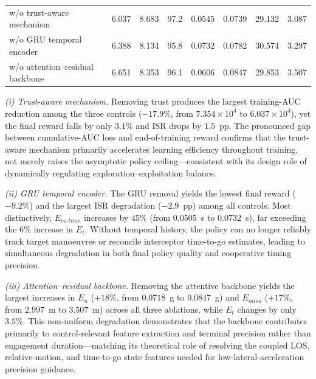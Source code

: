 \documentclass[11pt]{article}
\begin{document}
\begin{tcolorbox}[enhanced,breakable,colback=white,colframe=addblue!55,
coltext=addblue,fontupper=\color{addblue},boxrule=0.6pt,arc=2pt,
left=9pt,right=9pt,top=7pt,bottom=7pt]
{{\begin{tabular}{lccccccc}
w/o trust-aware mechanism
& 6.037 & 8.683 & 97.2
& 0.0545 & 0.0739 & 29.132 & 3.087 \\

w/o GRU temporal encoder
& 6.388 & 8.134 & 95.8
& 0.0732 & 0.0782 & 30.574 & 3.297 \\

w/o attention--residual backbone
& 6.651 & 8.353 & 96.1
& 0.0606 & 0.0847 & 29.853 & 3.507 \\
\bottomrule
\end{tabular}
}
\par}
\end{tcolorbox}

\begin{tcolorbox}[enhanced,breakable,colback=white,colframe=addblue!55,
coltext=addblue,fontupper=\color{addblue},
boxrule=0.6pt,arc=2pt,left=9pt,right=9pt,top=7pt,bottom=7pt]
\emph{(i) Trust-aware mechanism.}  Removing trust produces the largest training-AUC
reduction among the three controls ($-17.9\%$, from $7.354\!\times\!10^4$ to
$6.037\!\times\!10^4$), yet the final reward falls by only $3.1\%$ and ISR drops by
$1.5$~pp.  The pronounced gap between cumulative-AUC loss and end-of-training reward confirms
that the trust-aware mechanism primarily accelerates learning efficiency throughout training,
not merely raises the asymptotic policy ceiling---consistent with its design role of
dynamically regulating exploration--exploitation balance.


\medskip
\emph{(ii) GRU temporal encoder.}  The GRU removal yields the lowest final reward
($-9.2\%$) and the largest ISR degradation ($-2.9$~pp) among all controls.  Most
distinctively, $E_{co\text{-}time}$ increases by $45\%$ (from $0.0505$~s to $0.0732$~s),
far exceeding the $6\%$ increase in $E_t$.  Without temporal history, the policy can no
longer reliably track target manoeuvres or reconcile interceptor time-to-go estimates,
leading to simultaneous degradation in both final policy quality and cooperative timing
precision.

\medskip
\emph{(iii) Attention--residual backbone.}  Removing the attentive backbone yields the
largest increases in $E_n$ ($+18\%$, from $0.0718$~g to $0.0847$~g) and $E_{miss}$
($+17\%$, from $2.997$~m to $3.507$~m) across all three ablations, while $E_t$ changes by
only $3.5\%$.  This non-uniform degradation demonstrates that the backbone contributes
primarily to control-relevant feature extraction and terminal precision rather than
engagement duration---matching its theoretical role of resolving the coupled LOS,
relative-motion, and time-to-go state features needed for low-lateral-acceleration precision guidance.

\end{tcolorbox}
\end{document}
